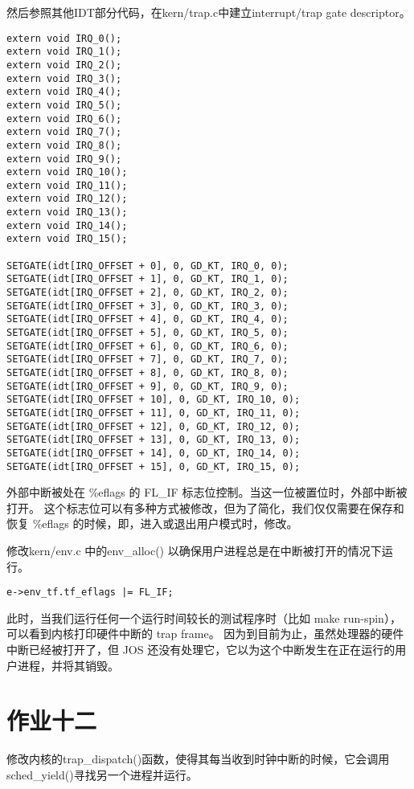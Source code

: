 \documentclass[12pt,a4paper]{article}
\begin{document}
然后参照其他IDT部分代码，在kern/trap.c中建立interrupt/trap gate descriptor。
\begin{lstlisting}[style=CPP]
extern void IRQ_0();
extern void IRQ_1();
extern void IRQ_2();
extern void IRQ_3();
extern void IRQ_4();
extern void IRQ_5();
extern void IRQ_6();
extern void IRQ_7();
extern void IRQ_8();
extern void IRQ_9();
extern void IRQ_10();
extern void IRQ_11();
extern void IRQ_12();
extern void IRQ_13();
extern void IRQ_14();
extern void IRQ_15();

SETGATE(idt[IRQ_OFFSET + 0], 0, GD_KT, IRQ_0, 0);
SETGATE(idt[IRQ_OFFSET + 1], 0, GD_KT, IRQ_1, 0);
SETGATE(idt[IRQ_OFFSET + 2], 0, GD_KT, IRQ_2, 0);
SETGATE(idt[IRQ_OFFSET + 3], 0, GD_KT, IRQ_3, 0);
SETGATE(idt[IRQ_OFFSET + 4], 0, GD_KT, IRQ_4, 0);
SETGATE(idt[IRQ_OFFSET + 5], 0, GD_KT, IRQ_5, 0);
SETGATE(idt[IRQ_OFFSET + 6], 0, GD_KT, IRQ_6, 0);
SETGATE(idt[IRQ_OFFSET + 7], 0, GD_KT, IRQ_7, 0);
SETGATE(idt[IRQ_OFFSET + 8], 0, GD_KT, IRQ_8, 0);
SETGATE(idt[IRQ_OFFSET + 9], 0, GD_KT, IRQ_9, 0);
SETGATE(idt[IRQ_OFFSET + 10], 0, GD_KT, IRQ_10, 0);
SETGATE(idt[IRQ_OFFSET + 11], 0, GD_KT, IRQ_11, 0);
SETGATE(idt[IRQ_OFFSET + 12], 0, GD_KT, IRQ_12, 0);
SETGATE(idt[IRQ_OFFSET + 13], 0, GD_KT, IRQ_13, 0);
SETGATE(idt[IRQ_OFFSET + 14], 0, GD_KT, IRQ_14, 0);
SETGATE(idt[IRQ_OFFSET + 15], 0, GD_KT, IRQ_15, 0);
\end{lstlisting}

外部中断被处在 \%eflags 的 FL\_IF 标志位控制。当这一位被置位时，外部中断被打开。
这个标志位可以有多种方式被修改，但为了简化，我们仅仅需要在保存和恢复 \%eflags 的时候，即，进入或退出用户模式时，修改。

修改kern/env.c 中的env\_alloc() 以确保用户进程总是在中断被打开的情况下运行。
\begin{lstlisting}[style=CPP]
e->env_tf.tf_eflags |= FL_IF;
\end{lstlisting}

此时，当我们运行任何一个运行时间较长的测试程序时（比如 make run-spin），可以看到内核打印硬件中断的 trap frame。
因为到目前为止，虽然处理器的硬件中断已经被打开了，但 JOS 还没有处理它，它以为这个中断发生在正在运行的用户进程，并将其销毁。

\section{作业十二}

修改内核的trap\_dispatch()函数，使得其每当收到时钟中断的时候，它会调用sched\_yield()寻找另一个进程并运行。
\end{document}
